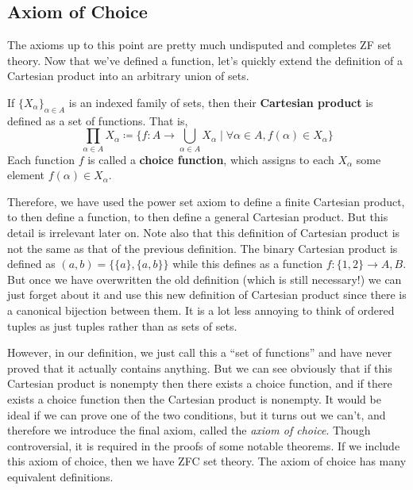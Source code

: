 \documentclass{article}
\begin{document}
  \subsection{Axiom of Choice}

    The axioms up to this point are pretty much undisputed and completes ZF set theory. Now that we've defined a function, let's quickly extend the definition of a Cartesian product into an arbitrary union of sets. 
    
    \begin{definition}
      If $\{X_\alpha\}_{\alpha \in A}$ is an indexed family of sets, then their \textbf{Cartesian product} is defined as a set of functions. That is, 
      \begin{equation}
        \prod_{\alpha \in A} X_\alpha \coloneqq \bigg\{ f: A \rightarrow \bigcup_{\alpha \in A} X_\alpha \;\Big|\; \forall \alpha \in A, f(\alpha) \in X_\alpha \bigg\} 
      \end{equation}
      Each function $f$ is called a \textbf{choice function}, which assigns to each $X_\alpha$ some element $f(\alpha) \in X_\alpha$. 
    \end{definition} 

    Therefore, we have used the power set axiom to define a finite Cartesian product, to then define a function, to then define a general Cartesian product. But this detail is irrelevant later on. Note also that this definition of Cartesian product is not the same as that of the previous definition. The binary Cartesian product is defined as $(a, b) = \{\{a\}, \{a, b\}\}$ while this defines as a function $f: \{1, 2\} \rightarrow A, B$. But once we have overwritten the old definition (which is still necessary!) we can just forget about it and use this new definition of Cartesian product since there is a canonical bijection between them. It is a lot less annoying to think of ordered tuples as just tuples rather than as sets of sets. 

    However, in our definition, we just call this a ``set of functions'' and have never proved that it actually contains anything. But we can see obviously that if this Cartesian product is nonempty then there exists a choice function, and if there exists a choice function then the Cartesian product is nonempty. It would be ideal if we can prove one of the two conditions, but it turns out we can't, and therefore we introduce the final axiom, called the \textit{axiom of choice}. Though controversial, it is required in the proofs of some notable theorems. If we include this axiom of choice, then we have ZFC set theory. The axiom of choice has many equivalent definitions. 
\end{document}
